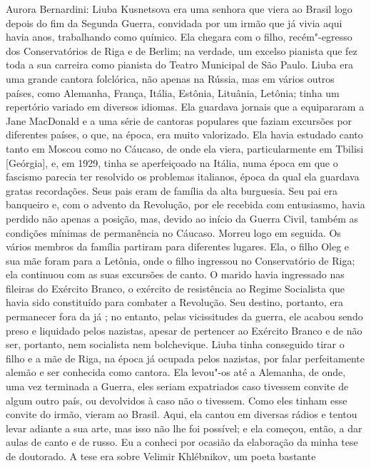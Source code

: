\noindent
Aurora Bernardini: Liuba Kusnetsova era uma senhora que viera
ao Brasil logo depois do fim da Segunda Guerra, convidada por um irmão
que já vivia aqui havia anos, trabalhando como químico. Ela chegara com
o filho, recém"-egresso dos Conservatórios de Riga e de Berlim; na
verdade, um excelso pianista que fez toda a sua carreira como pianista
do Teatro Municipal de São Paulo. Liuba era uma grande cantora
folclórica, não apenas na Rússia, mas em vários outros países, como
Alemanha, França, Itália, Estônia, Lituânia, Letônia; tinha um
repertório variado em diversos idiomas. Ela guardava jornais que a
equipararam a Jane MacDonald e a uma série de cantoras populares que
faziam excursões por diferentes países, o que, na época, era muito
valorizado. Ela havia estudado canto tanto em Moscou como no Cáucaso, de
onde ela viera, particularmente em Tbilisi [Geórgia], e, em 1929,
tinha se aperfeiçoado na Itália, numa época em que o fascismo parecia
ter resolvido os problemas italianos, época da qual ela guardava gratas
recordações. Seus pais eram de família da alta burguesia. Seu pai era
banqueiro e, com o advento da Revolução, por ele recebida com
entusiasmo, havia perdido não apenas a posição, mas, devido ao início da
Guerra Civil, também as condições mínimas de permanência no Cáucaso.
Morreu logo em seguida. Os vários membros da família partiram para
diferentes lugares. Ela, o filho Oleg e sua mãe foram para a Letônia,
onde o filho ingressou no Conservatório de Riga; ela continuou com as
suas excursões de canto. O marido havia ingressado nas fileiras do
Exército Branco, o exército de resistência ao Regime Socialista que
havia sido constituído para combater a Revolução. Seu destino, portanto,
era permanecer fora da já ; no entanto, pelas vicissitudes da
guerra, ele acabou sendo preso e liquidado pelos nazistas, apesar de
pertencer ao Exército Branco e de não ser, portanto, nem socialista nem
bolchevique. Liuba tinha conseguido tirar o filho e a mãe de Riga, na
época já ocupada pelos nazistas, por falar
perfeitamente alemão e ser conhecida como cantora. Ela levou"-os até a
Alemanha, de onde, uma vez terminada a Guerra, eles seriam expatriados
caso tivessem convite de algum outro país, ou devolvidos à  caso não
o tivessem. Como eles tinham esse convite do irmão, vieram ao Brasil.
Aqui, ela cantou em diversas rádios e tentou levar adiante a sua arte,
mas isso não lhe foi possível; e ela começou, então, a dar aulas de
canto e de russo. Eu a conheci por ocasião da elaboração da minha tese
de doutorado. A tese era sobre Velimir Khlébnikov, um poeta bastante
